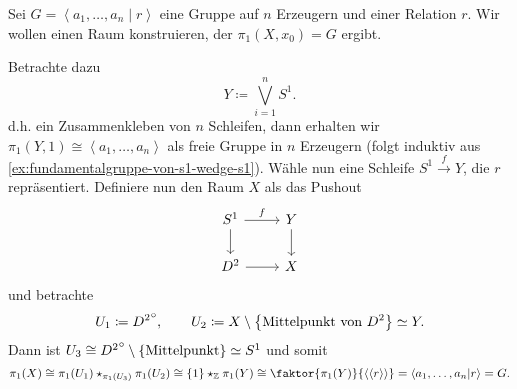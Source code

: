 \begin{example}
    Sei $G = \left< a_1,\ldots,a_n\mid r \right> $ eine Gruppe auf $n$ Erzeugern und einer Relation  $r$. Wir wollen einen Raum konstruieren, der  $\pi_1(X,x_0) = G$ ergibt.

    Betrachte dazu
    \[
    Y \coloneqq  \bigvee_{i=1}^{n} S^1
    .\] 
    d.h. ein Zusammenkleben von $n$ Schleifen, dann erhalten wir $\pi_1(Y,1) \cong \left< a_1,\ldots,a_n \right> $ als freie Gruppe in $n$ Erzeugern (folgt induktiv aus \autoref{ex:fundamentalgruppe-von-s1-wedge-s1}). Wähle nun eine Schleife $S^1 \stackrel{f}{\longrightarrow} Y$, die $r$ repräsentiert. Definiere nun den Raum  $X$ als das Pushout
     \[
    \begin{tikzcd}
        S^1 \ar[swap]{d}{} \ar{r}{f} & Y \ar{d}{} \\
        D^2 \ar[swap]{r}{} & X
    \end{tikzcd}
    \]
   und betrachte
   \[
       U_1 \coloneqq  {D^2}^\circ, \qquad U_2\coloneqq X \setminus \left \{\text{Mittelpunkt von $D^2$}\right\} \simeq Y
   .\] 
   Dann ist $U_3 \cong {D^2}^\circ \setminus \left \{\text{Mittelpunkt}\right\} \simeq S^1$ und somit
   \[
       \pi_1(X) \cong \pi_1(U_1) \star_{\pi_1(U_3)} \pi_1(U_2) \cong \left \{1\right\} \star_{\Z} \pi_1(Y) \cong \faktor{\pi_1(Y)}{\left< \left< r \right>  \right> } = \left< a_1,\ldots,a_n|r \right>  = G
   .\] 
\end{example}
